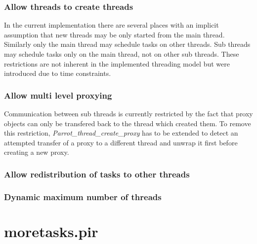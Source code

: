 \documentclass[bachelor,english]{hgbthesis}
\begin{document}
\subsection{Allow threads to create threads}

In the current implementation there are several places with an implicit assumption that new threads may be only started from the main thread. Similarly only the main thread may schedule tasks on other threads. Sub threads may schedule tasks only on the main thread, not on other sub threads. These restrictions are not inherent in the implemented threading model but were introduced due to time constraints.

\subsection{Allow multi level proxying}

Communication between sub threads is currently restricted by the fact that proxy objects can only be transfered back to the thread which created them. To remove this restriction, \textit{Parrot\_thread\_create\_proxy} has to be extended to detect an attempted transfer of a proxy to a different thread and unwrap it first before creating a new proxy.

\subsection{Allow redistribution of tasks to other threads}

\subsection{Dynamic maximum number of threads}

\appendix
\chapter{moretasks.pir}
\label{app:moretasks}
\end{document}
